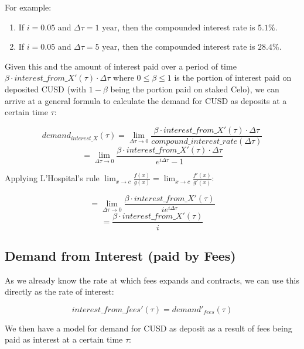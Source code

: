 For example:
\begin{enumerate}
    \item If $i=0.05$ and $\Delta\tau=1\textrm{ year}$, then the compounded interest rate is $5.1\%$.
    \item If $i=0.05$ and $\Delta\tau=5\textrm{ year}$, then the compounded interest rate is $28.4\%$.
\end{enumerate}

Given this and the amount of interest paid over a period of time $\beta \cdot interest\_from\_X'(\tau)\cdot \Delta\tau$ where $0\leq \beta \leq 1$ is the portion of interest paid on deposited CUSD 
(with $1-\beta$ being the portion paid on staked Celo), we can arrive at a general formula to calculate the demand for CUSD as deposits at a certain time $\tau$:

\begin{equation}
    demand_{interest\_X}(\tau) = \lim_{\Delta\tau\to0} \frac{\beta \cdot interest\_from\_X'(\tau)\cdot \Delta\tau}{compound\_interest\_rate(\Delta\tau)}
\end{equation}
\begin{equation}
    = \lim_{\Delta\tau\to0} \frac{\beta \cdot interest\_from\_X'(\tau)\cdot \Delta\tau}{e^{i\Delta\tau} - 1}
\end{equation}

Applying L'Hospital's rule $\lim_{x\to c} \frac{f(x)}{g(x)} = \lim_{x\to c} \frac{f'(x)}{g'(x)}$:

\begin{equation}
    = \lim_{\Delta\tau\to0} \frac{\beta \cdot interest\_from\_X'(\tau)}{ie^{i\Delta\tau}}
\end{equation}
\begin{equation}
    = \frac{\beta \cdot interest\_from\_X'(\tau)}{i}
\end{equation}

\subsection{Demand from Interest (paid by Fees)}

As we already know the rate at which fees expands and contracts, we can use this directly as the rate of interest:

\begin{equation}
    interest\_from\_fees'(\tau) = demand'_{fees}(\tau)
\end{equation}

We then have a model for demand for CUSD as deposit as a result of fees being paid as interest at a certain time $\tau$:

